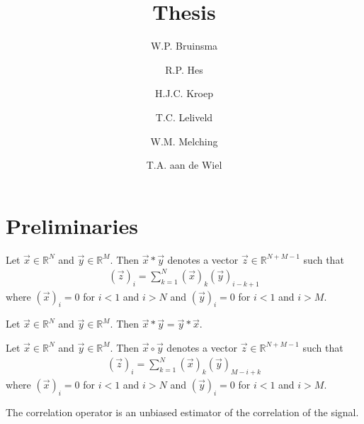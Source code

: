 \documentclass[a4paper, openany, oneside]{memoir}
\title{Thesis}
\author{W.P. Bruinsma \and R.P. Hes \and H.J.C. Kroep \and T.C. Leliveld \and W.M. Melching \and T.A. aan de Wiel}
\begin{document}
\frontmatter

\begin{titlingpage}
  \pagestyle{empty}
  \maketitle
\end{titlingpage}

\tableofcontents

\mainmatter
\chapter{Preliminaries}
\begin{definition}[Convolution]
    Let $\vec{x} \in \mathbb{R}^N$ and $\vec{y} \in \mathbb{R}^M$. Then $\vec{x} \ast \vec{y}$ denotes a vector $\vec{z} \in \mathbb{R}^{N+M-1}$ such that
    \begin{align*}
        (\vec{z})_i = \sum_{k=1}^{N} (\vec{x})_k (\vec{y})_{i-k+1}
    \end{align*}
    where $(\vec{x})_i=0$ for $i < 1$ and $i > N$ and $(\vec{y})_i=0$ for $i < 1$ and $i > M$.
\end{definition}
\begin{theorem} \label{th:conv-comm}
    Let $\vec{x} \in \mathbb{R}^N$ and $\vec{y} \in \mathbb{R}^M$. Then $\vec{x} \ast \vec{y} = \vec{y} \ast \vec{x}$.
\end{theorem}
\begin{definition}[Correlation]
    Let $\vec{x} \in \mathbb{R}^N$ and $\vec{y} \in \mathbb{R}^M$. Then $\vec{x} \circ \vec{y}$ denotes a vector $\vec{z} \in \mathbb{R}^{N+M-1}$ such that
    \begin{align*}
        (\vec{z})_i = \sum_{k=1}^{N} (\vec{x})_k (\vec{y})_{M-i+k}
    \end{align*}
    where $(\vec{x})_i=0$ for $i < 1$ and $i > N$ and $(\vec{y})_i=0$ for $i < 1$ and $i > M$.
\end{definition}
\begin{theorem} \label{th:corr-unbiased}
    The correlation operator is an unbiased estimator of the correlation of the signal.
\end{theorem}
\end{document}
